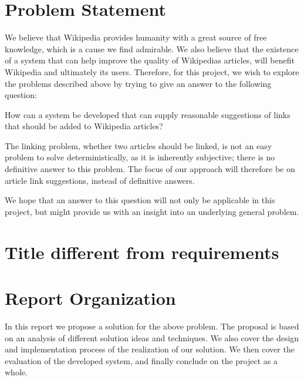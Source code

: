 \section{Problem Statement}\label{sec:problem_statement}

We believe that Wikipedia provides humanity with a great source of free knowledge, which is a cause we find admirable. We also believe that the existence of a system that can help improve the quality of Wikipedias articles, will benefit Wikipedia and ultimately its users. Therefore, for this project, we wish to explore the problems described above by trying to give an answer to the following question:

\begin{formal}
How can a system be developed that can supply reasonable suggestions of links that should be added to Wikipedia articles?
\end{formal}

The linking problem, whether two articles should be linked, is not an easy problem to solve deterministically, as it is inherently subjective; there is no definitive answer to this problem. The focus of our approach will therefore be on article link suggestions, instead of definitive answers. %

We hope that an answer to this question will not only be applicable in this project, but might provide us with an insight into an underlying general problem.

\section{Title different from requirements} %
\label{sec:title_different_from_requirements}


\section{Report Organization}
In this report we propose a solution for the above problem. The proposal is based on an analysis of different solution ideas and techniques. We also cover the design and implementation process of the realization of our solution. We then cover the evaluation of the developed system, and finally conclude on the project as a whole. 

